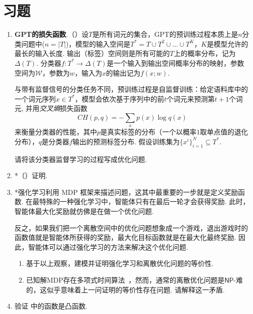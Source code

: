 \section{习题}

\begin{enumerate}[wide, labelindent=0pt]
    \item \textbf{GPT的损失函数}.（\cite{radfordImprovingLanguageUnderstanding}）设$T$是所有词元的集合，GPT的预训练过程本质上是$n$分类问题中($n = |T|$)，模型的输入空间是$T^\ast=T\cup T^2 \cup \dots \cup T^K$，$K$是模型允许的最长的输入长度. 输出（标签）空间则是所有可能的$T$上的概率分布，记为$\Delta(T)$. 分类器$f:T^\ast \to \Delta(T)$是一个输入到输出空间概率分布的映射，参数空间为$\mathcal W$，参数为$w$，输入为$x$的输出记为$f(x;w)$. 
    
    与带有监督信号的分类任务不同，预训练过程是自监督训练：给定语料库中的一个词元序列$x \in T^\ast$，模型会依次基于序列中的前$t$个词元来预测第$t+1$个词元, 并用\textit{交叉熵}损失函数
    \[CH(p,q) = -\sum_{x} p(x)\log q(x)\]
    来衡量分类器的性能，其中$p$是真实标签的分布（一个以概率$1$取单点值的退化分布），$q$是分类器$f$输出的预测标签分布. 假设训练集为$\{x^i\}_{i=1}^N\subseteq T^\ast$. 
    
    请将该分类器监督学习的过程写成优化问题.
    \item *\label{exercise:no-free-lunch}（\cite{wolpertNoFreeLunch1997}）证明.
    
    \item *强化学习利用 MDP 框架来描述问题，这其中最重要的一步就是定义奖励函数. 在最特殊的一种强化学习中，智能体只有在最后一轮才会获得奖励. 此时，智能体最大化奖励就仿佛是在做一个优化问题. 
    
    反之，如果我们把一个离散空间中的优化问题想象成一个游戏，退出游戏时的函数值就是智能体所获得的奖励，最大化目标函数就是在最大化最终奖励. 因此，智能体可以通过强化学习的方法来解决这个优化问题. 
    
    \begin{enumerate}
        \item 基于以上观察，建模并证明强化学习和离散优化问题的等价性.
        \item 已知解MDP存在多项式时间算法~\cite{littmanComplexitySolvingMarkov1995}，然而，通常的离散优化问题是$\mathsf{NP}$-难的，这似乎意味着上一问证明的等价性存在问题. 请解释这一矛盾.
    \end{enumerate}
    
    
    \item \label{exercise:convex-function} 验证 中的函数是凸函数.
    

\end{enumerate}
